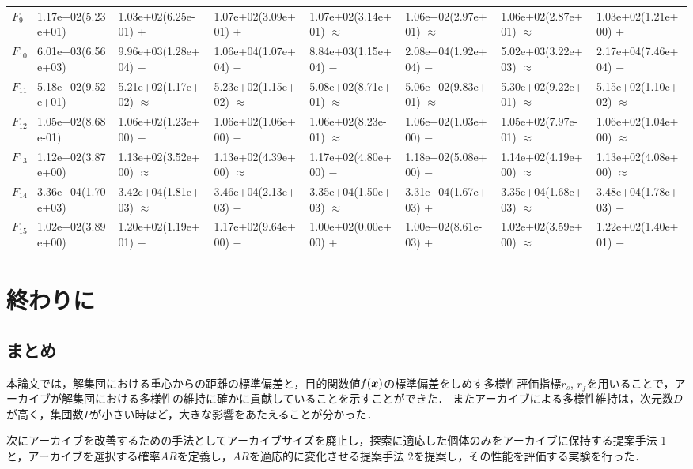 \documentclass[a4paper,11pt,oneside,openany]{jsbook}
\def\vector#1{\mbox{\boldmath $#1$}}
\begin{document}
\begin{landscape}
\begin{table}[!tbp]
\begin{center}
\begin{tabular}{llllllll}
$F_{9}$&1.17e+02(5.23e+01)&1.03e+02(6.25e-01) +&1.07e+02(3.09e+01) +&1.07e+02(3.14e+01) $\approx$&1.06e+02(2.97e+01) $\approx$&1.06e+02(2.87e+01) $\approx$&1.03e+02(1.21e+00) +\tabularnewline
$F_{10}$&6.01e+03(6.56e+03)&9.96e+03(1.28e+04) −&1.06e+04(1.07e+04) −&8.84e+03(1.15e+04) −&2.08e+04(1.92e+04) −&5.02e+03(3.22e+03) $\approx$&2.17e+04(7.46e+04) −\tabularnewline
$F_{11}$&5.18e+02(9.52e+01)&5.21e+02(1.17e+02) $\approx$&5.23e+02(1.15e+02) $\approx$&5.08e+02(8.71e+01) $\approx$&5.06e+02(9.83e+01) $\approx$&5.30e+02(9.22e+01) $\approx$&5.15e+02(1.10e+02) $\approx$\tabularnewline
$F_{12}$&1.05e+02(8.68e-01)&1.06e+02(1.23e+00) −&1.06e+02(1.06e+00) −&1.06e+02(8.23e-01) $\approx$&1.06e+02(1.03e+00) −&1.05e+02(7.97e-01) $\approx$&1.06e+02(1.04e+00) $\approx$\tabularnewline
$F_{13}$&1.12e+02(3.87e+00)&1.13e+02(3.52e+00) $\approx$&1.13e+02(4.39e+00) $\approx$&1.17e+02(4.80e+00) −&1.18e+02(5.08e+00) −&1.14e+02(4.19e+00) $\approx$&1.13e+02(4.08e+00) $\approx$\tabularnewline
$F_{14}$&3.36e+04(1.70e+03)&3.42e+04(1.81e+03) $\approx$&3.46e+04(2.13e+03) −&3.35e+04(1.50e+03) $\approx$&3.31e+04(1.67e+03) +&3.35e+04(1.68e+03) $\approx$&3.48e+04(1.78e+03) −\tabularnewline
$F_{15}$&1.02e+02(3.89e+00)&1.20e+02(1.19e+01) −&1.17e+02(9.64e+00) −&1.00e+02(0.00e+00) +&1.00e+02(8.61e-03) +&1.02e+02(3.59e+00) $\approx$&1.22e+02(1.40e+01) −\tabularnewline
\hline
\end{tabular}\end{center}

\end{table}
\end{landscape}
\newpage

\chapter{終わりに}
\section{まとめ}
本論文では，解集団における重心からの距離の標準偏差と，目的関数値$f(\vector{x})$の標準偏差をしめす多様性評価指標$r_s$, $r_f$を用いることで，アーカイブが解集団における多様性の維持に確かに貢献していることを示すことができた．
またアーカイブによる多様性維持は，次元数$D$が高く，集団数$P$が小さい時ほど，大きな影響をあたえることが分かった．

次にアーカイブを改善するための手法としてアーカイブサイズを廃止し，探索に適応した個体のみをアーカイブに保持する提案手法 1と，アーカイブを選択する確率$AR$を定義し，$AR$を適応的に変化させる提案手法 2を提案し，その性能を評価する実験を行った．
\end{document}
